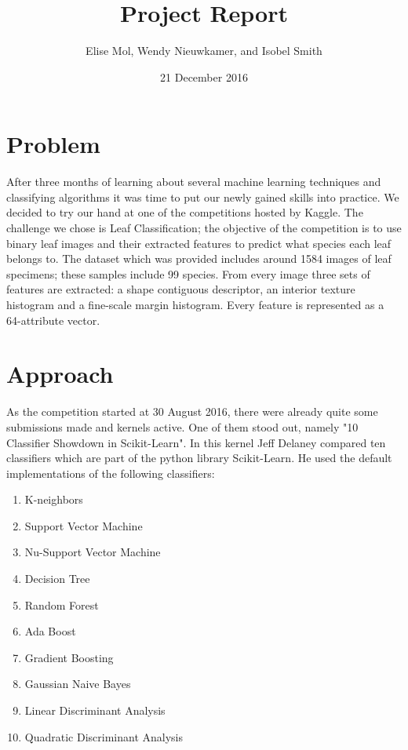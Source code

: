 \documentclass{article}
\title {Project Report}
\date{21 December 2016}
\author{Elise Mol, Wendy Nieuwkamer, and Isobel Smith}
\begin{document}
\maketitle

\section{Problem}

After three months of learning about several machine learning techniques and classifying algorithms it was time to put our newly gained skills into practice. We decided to try our hand at one of the competitions hosted by Kaggle. The challenge we chose is Leaf Classification; the objective of the competition is to use binary leaf images and their extracted features to predict what species each leaf belongs to. The dataset which was provided includes around 1584 images of leaf specimens; these samples include 99 species. From every image three sets of features are extracted: a shape contiguous descriptor, an interior texture histogram and a fine-scale margin histogram. Every feature is represented as a 64-attribute vector. 


\section{Approach}
As the competition started at 30 August 2016, there were already quite some submissions made and kernels active. One of them stood out, namely "10 Classifier Showdown in Scikit-Learn". In this kernel
Jeff Delaney compared ten classifiers which are part of the python library Scikit-Learn. He used the default implementations of the following classifiers:

\begin{enumerate}
	\item K-neighbors
	\item Support Vector Machine
	\item Nu-Support Vector Machine
	\item Decision Tree
	\item Random Forest
	\item Ada Boost
	\item Gradient Boosting
	\item Gaussian Naive Bayes
	\item Linear Discriminant Analysis
	\item Quadratic Discriminant Analysis
\end{enumerate}
\end{document}
